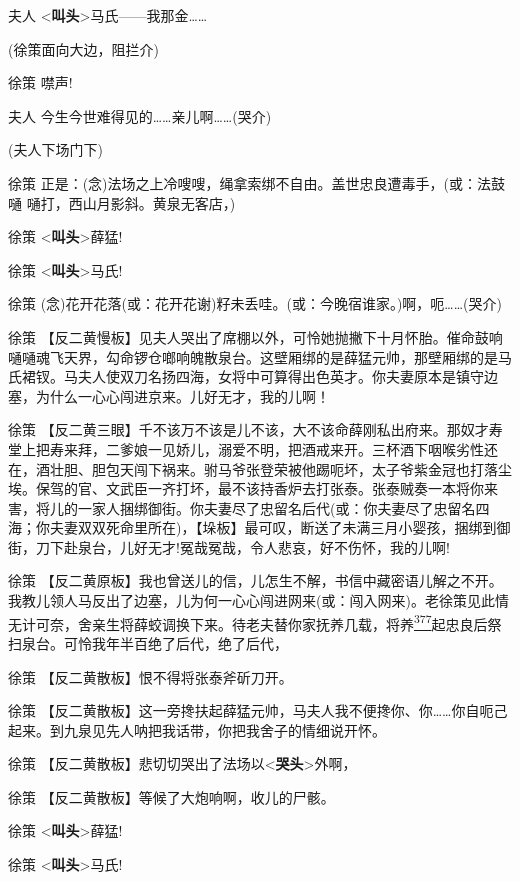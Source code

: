 夫人
\textless{}\textbf{叫头}\textgreater{}马氏------我那金\ldots{}\ldots{}

(徐策面向大边，阻拦介)

徐策 噤声!

夫人 今生今世难得见的\ldots{}\ldots{}亲儿啊\ldots{}\ldots{}(哭介)

(夫人下场门下)

徐策
正是：(念)法场之上冷嗖嗖，绳拿索绑不自由。盖世忠良遭毒手，(或：法鼓嗵
嗵打，西山月影斜。黄泉无客店，)

徐策 \textless{}\textbf{叫头}\textgreater{}薛猛!

徐策 \textless{}\textbf{叫头}\textgreater{}马氏!

徐策
(念)花开花落(或：花开花谢)籽未丢哇。(或：今晚宿谁家。)啊，呃\ldots{}\ldots{}(哭介)

徐策
【反二黄慢板】见夫人哭出了席棚以外，可怜她抛撇下十月怀胎。催命鼓响嗵嗵魂飞天界，勾命锣仓啷响魄散泉台。这壁厢绑的是薛猛元帅，那壁厢绑的是马氏裙钗。马夫人使双刀名扬四海，女将中可算得出色英才。你夫妻原本是镇守边塞，为什么一心心闯进京来。儿好无才，我的儿啊！

徐策
【反二黄三眼】千不该万不该是儿不该，大不该命薛刚私出府来。那奴才寿堂上把寿来拜，二爹娘一见娇儿，溺爱不明，把酒戒来开。三杯酒下咽喉劣性还在，酒壮胆、胆包天闯下祸来。驸马爷张登荣被他踢呃坏，太子爷紫金冠也打落尘埃。保驾的官、文武臣一齐打坏，最不该持香炉去打张泰。张泰贼奏一本将你来害，将儿的一家人捆绑御街。你夫妻尽了忠留名后代(或：你夫妻尽了忠留名四海；你夫妻双双死命里所在)，【垛板】最可叹，断送了未满三月小婴孩，捆绑到御街，刀下赴泉台，儿好无才!冤哉冤哉，令人悲哀，好不伤怀，我的儿啊!

徐策
【反二黄原板】我也曾送儿的信，儿怎生不解，书信中藏密语儿解之不开。我教儿领人马反出了边塞，儿为何一心心闯进网来(或：闯入网来)。老徐策见此情无计可奈，舍亲生将薛蛟调换下来。待老夫替你家抚养几载，将养\protect\hyperlink{fn377}{\textsuperscript{377}}起忠良后祭扫泉台。可怜我年半百绝了后代，绝了后代，

徐策 【反二黄散板】恨不得将张泰斧斫刀开。

徐策
【反二黄散板】这一旁搀扶起薛猛元帅，马夫人我不便搀你、你\ldots{}\ldots{}你自呃己起来。到九泉见先人呐把我话带，你把我舍子的情细说开怀。

徐策
【反二黄散板】悲切切哭出了法场以\textless{}\textbf{哭头}\textgreater{}外啊，

徐策 【反二黄散板】等候了大炮响啊，收儿的尸骸。

徐策 \textless{}\textbf{叫头}\textgreater{}薛猛!

徐策 \textless{}\textbf{叫头}\textgreater{}马氏!

